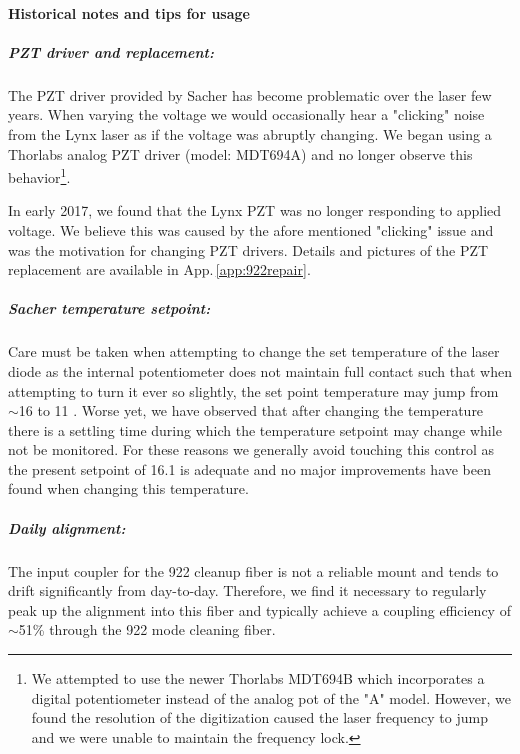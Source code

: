 \paragraph{Historical notes and tips for usage}
\subparagraph{PZT driver and replacement:}
The PZT driver provided by Sacher has become problematic over the laser few years.
When varying the voltage we would occasionally hear a "clicking" noise from the Lynx laser as if the voltage was abruptly changing.
We began using a Thorlabs analog PZT driver (model: MDT694A) and no longer observe this behavior\footnote{We attempted to use the newer Thorlabs MDT694B which incorporates a digital potentiometer instead of the analog pot of the "A" model.
However, we found the resolution of the digitization caused the laser frequency to jump and we were unable to maintain the frequency lock.}.

In early 2017, we found that the Lynx PZT was no longer responding to applied voltage.
We believe this was caused by the afore mentioned "clicking" issue and was the motivation for changing PZT drivers.
Details and pictures of the PZT replacement are available in App.\,\ref{app:922repair}.

\subparagraph{Sacher temperature setpoint:}
Care must be taken when attempting to change the set temperature of the laser diode as the internal potentiometer does not maintain full contact such that when attempting to turn it ever so slightly, the set point temperature may jump from $\sim$16 \degreeC to 11 \degreeC.
Worse yet, we have observed that after changing the temperature there is a settling time during which the temperature setpoint may change while not be monitored.
For these reasons we generally avoid touching this control as the present setpoint of 16.1 \degreeC is adequate and no major improvements have been found when changing this temperature.

\subparagraph{Daily alignment:}
The input coupler for the 922 cleanup fiber is not a reliable mount and tends to drift significantly from day-to-day.
Therefore, we find it necessary to regularly peak up the alignment into this fiber and typically achieve a coupling efficiency of $\sim$51\% through the 922 mode cleaning fiber.

		
